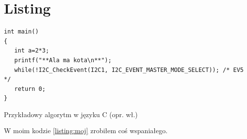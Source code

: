 \section{Listing}

\begin{listing}
\begin{verbatim} 
int main()
{
   int a=2*3;
   printf("**Ala ma kota\n**");
   while(!I2C_CheckEvent(I2C1, I2C_EVENT_MASTER_MODE_SELECT)); /* EV5 */
   return 0;
}
\end{verbatim}
\caption{Przykładowy algorytm w języku C (opr. wł.)} \label{listing:moj}
\end{listing}

W moim kodzie \ref{listing:moj} zrobiłem coś wspaniałego. \lipsum[4]
